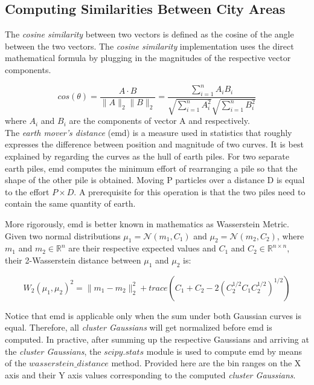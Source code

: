 	\subsection{Computing Similarities Between City Areas}
	The \textit{cosine similarity} between two vectors is defined as the cosine of the angle between the two vectors. The \textit{cosine similarity} implementation uses the direct mathematical formula by plugging in the magnitudes of the respective vector components.
	
	\begin{equation}
	cos(\theta)=\frac{A\cdot B}{{\lVert}A{\rVert}       
		_2{\lVert}B{\rVert}_2}=\frac{\sum_{i=1}^n{A_iB_i}}{\sqrt{\sum_{i=1}^n{A_i^2}}\sqrt{\sum_{i=1}^n{B_i^2}}}
	\end{equation}
	where $A_i$ and $B_i$ are the components of vector A and respectively. \\
	
	The \textit{earth mover's distance} (emd) is a measure used in statistics that roughly expresses the difference between position and magnitude of two curves. It is best explained by regarding the curves as the hull of earth piles. For two separate earth piles, emd computes the minimum effort of rearranging a pile so that the shape of the other pile is obtained. Moving P particles over a distance D is equal to the effort $P \times D$. A prerequisite for this operation is that the two piles need to contain the same quantity of earth.
	
	More rigorously, emd is better known in mathematics as Wasserstein Metric. Given two normal distributions $\mu_1=\mathcal{N}(m_1,C_1)$ and $\mu_2=\mathcal{N}(m_2,C_2)$, where $m_1$ and $m_2 \in \mathbb{R}^{n}$ are their respective expected values and $C_1$ and $C_2 \in \mathbb{R}^{n\times n}$, their 2-Wasserstein distance between $\mu_1$ and $\mu_2$ is:
	
	\begin{equation}
	W_2(\mu_1,\mu_2)^2={\lVert}m_1-m_2{\rVert}^2_2+trace(C_1+C_2-2(C_2^{1/2}C_1C_2^{1/2})^{1/2})
	\end{equation}
	
	Notice that emd is applicable only when the sum under both Gaussian curves is equal. Therefore, all \textit{cluster Gaussians} will get normalized before emd is computed. In practive, after summing up the respective Gaussians and arriving at the \textit{cluster Gaussians}, the $scipy.stats$ module is used to compute emd by means of the $wasserstein\_distance$ method. Provided here are the bin ranges on the X axis and their Y axis values corresponding to the computed \textit{cluster Gaussians}.
	
